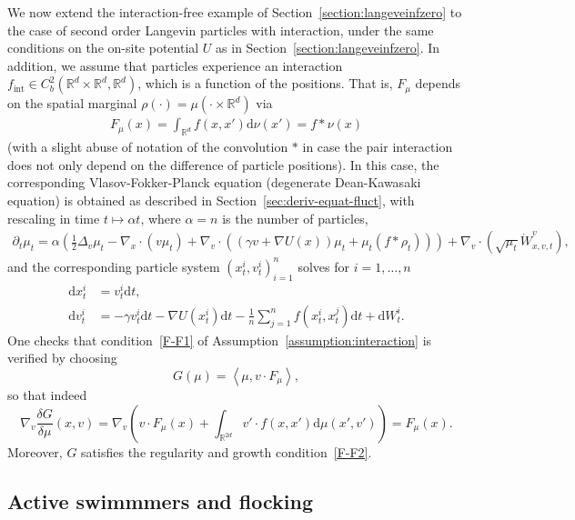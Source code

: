 \documentclass{article}
\newcommand{\dd}{\text{d}}
\newcommand{\av}[1]{\left<#1\right>}
\newcommand{\R}{\mathbb{R}}
\begin{document}
We now extend the interaction-free example of Section~\ref{section:langeveinfzero} to the case of second order
Langevin particles with interaction, under the same conditions on the on-site potential $U$ as in
Section~\ref{section:langeveinfzero}. In addition, we assume that particles experience an interaction
$f_\text{int} \in C^2_b(\R^d \times \R^d, \R^d)$, which is a function of the positions. That is, $F_\mu$
depends on the spatial marginal $\rho(\cdot)=\mu(\cdot\times \R^d)$ via
\begin{align*}
    F_{\mu}(x) = \int_{\R^d} f (x,x') \dd \nu(x') = f \ast\nu(x)
\end{align*}
(with a slight abuse of notation of the convolution $\ast$ in case the pair interaction does not only depend
on the difference of particle positions).
In this case, the corresponding Vlasov-Fokker-Planck equation (degenerate Dean-Kawasaki equation) is obtained
as described in Section~\ref{sec:deriv-equat-fluct}, with rescaling in time $t \mapsto \alpha t$, where
$\alpha = n$ is the number of particles,
\begin{align*}
  \partial_t \mu_t = \alpha\left(\frac{1}{2} \Delta_v \mu_t -  \nabla_x \cdot (v \mu_t)
  + \nabla_v \cdot( (\gamma v + \nabla U(x)) \mu_t + \mu_t (f * \rho_t))\right) + \nabla_v \cdot (\sqrt{\mu_t} \dot W_{x,v,t}^v),
\end{align*}
and the corresponding particle system $\left(x_t^i, v_t^i\right)_{i =1}^n$ solves for $i = 1, \dots, n$
\begin{align*}              
\dd x_t^i &=  v_t^i \dd t,\\
    \dd v_t^i &=  - \gamma v_t^i \dd t - \nabla U(x_t^i) \dd t - \frac 1 n  \sum_{j =1}^n f(x_t^i,x_t^j) \dd t  +  \dd W_t^i.
\end{align*}
One checks that condition~\ref{F-F1} of Assumption~\ref{assumption:interaction} is verified by choosing
\begin{equation*}
  G(\mu) = \av{\mu, v \cdot F_\mu},
\end{equation*}
so that indeed 
\begin{equation*}
  \nabla_v \frac{\delta G}{\delta \mu}(x,v) = \nabla_v\left(v \cdot F_\mu(x) + \int_{\R^{2d}} v'\cdot f (x,x') \dd \mu(x',v')\right)
  = F_{\mu}(x).
\end{equation*}
Moreover, $G$ satisfies the regularity and growth condition~\ref{F-F2}.


\subsection{Active swimmmers and flocking}
\label{sec.swimmers-flocking}
\end{document}
